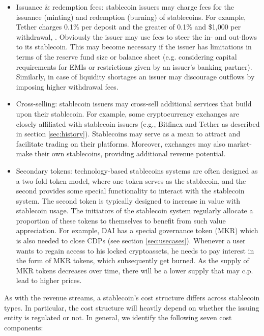 \documentclass[conference]{IEEEtran}
\begin{document}
\begin{itemize}
	\item Issuance \& redemption fees: stablecoin issuers may charge fees for the issuance (minting) and redemption (burning) of stablecoins. For example, Tether charges 0.1\% per deposit and the greater of 0.1\% and \$1,000 per withdrawal, \cite{Tether4}. Obviously the issuer may use fees to steer the in- and out-flows to its stablecoin. This may become necessary if the issuer has limitations in terms of the reserve fund size or balance sheet (e.g. considering capital requirements for \acp{EMI} or restrictions given by an issuer's banking partner). Similarly, in case of liquidity shortages an issuer may discourage outflows by imposing higher withdrawal fees.
	\item Cross-selling: stablecoin issuers may cross-sell additional services that build upon their stablecoin. For example, some cryptocurrency exchanges are closely affiliated with stablecoin issuers (e.g., Bitfinex and Tether as described in section \ref{sec:history}). Stablecoins may serve as a mean to attract and facilitate trading on their platforms. Moreover, exchanges may also market-make their own stablecoins, providing additional revenue potential.
	\item Secondary tokens: technology-based stablecoins systems are often designed as a two-fold token model, where one token serves as the stablecoin, and the second provides some special functionality to interact with the stablecoin system. The second token is typically designed to increase in value with stablecoin usage. The initiators of the stablecoin system regularly allocate a proportion of these tokens to themselves to benefit from such value appreciation. For example, DAI has a special governance token (MKR) which is also needed to close \acp{CDP} (see section \ref{sec:usecases}). Whenever a user wants to regain access to his locked cryptoassets, he needs to pay interest in the form of MKR tokens, which subsequently get burned. As the supply of MKR tokens decreases over time, there will be a lower supply that may c.p. lead to higher prices.
\end{itemize}

As with the revenue streams, a stablecoin's cost structure differs across stablecoin types. In particular, the cost structure will heavily depend on whether the issuing entity is regulated or not. In general, we identify the following seven cost components:
\end{document}
